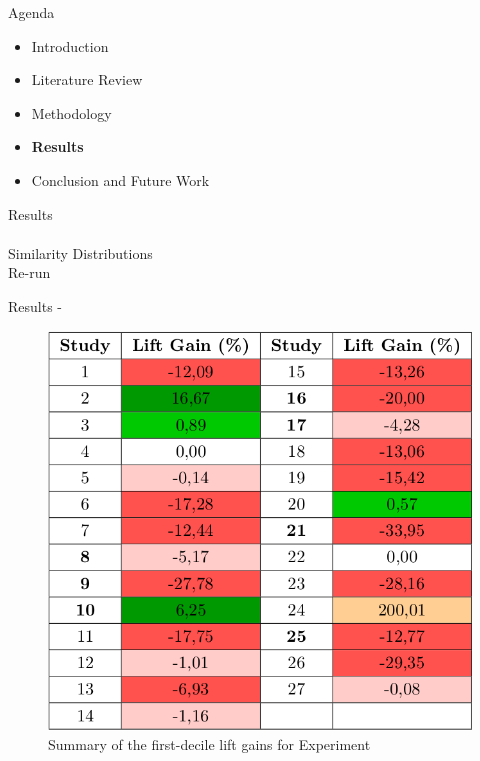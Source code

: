 \begin{frame}{Agenda}
\begin{itemize}
    \item Introduction
    \item Literature Review
    \item Methodology
    \item \textbf{Results}
    \item Conclusion and Future Work
\end{itemize}
\end{frame}

%

\begin{frame}{Results} \pause
    \fullNameExperimentI{}\\ \pause
    \vspace{0.5cm}
    \fullNameExperimentII{}\\ \pause
    \vspace{0.5cm}
    Similarity Distributions \\ \pause
    \vspace{0.5cm}
    Re-run \fullNameExperimentII{}
\end{frame}


\begin{frame}{Results - \fullNameExperimentI{}} \pause
    \begin{figure}
        \centering
        \includegraphics[width=.6\linewidth]{fig/ch4-table-exp-i.png}
        \caption{Summary of the first-decile lift gains for Experiment \nameExperimentI}
    \end{figure}
\end{frame}



